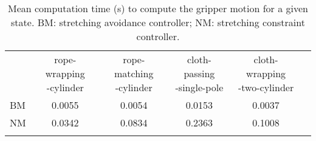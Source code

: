 \begin{table}[h]
\centering
\caption{Mean computation time (s) to compute the gripper motion for a given state. BM: stretching avoidance controller; NM: stretching constraint controller.}
\begin{tabular}{lccccc}
\hline\noalign{\smallskip}
        & \makecell{rope-wrapping\\-cylinder} 
        & \makecell{rope-matching\\-cylinder}
        & \makecell{cloth-passing\\-single-pole}
        & \makecell{cloth-wrapping\\-two-cylinder} \\
\noalign{\smallskip}\hline\noalign{\smallskip}
BM      & 0.0055   & 0.0054  & 0.0153  & 0.0037 \\
NM      & 0.0342   & 0.0834  & 0.2363  & 0.1008 \\
\noalign{\smallskip}\hline
\end{tabular}
\label{tbl:constraint_controller_time_report}
\end{table}
